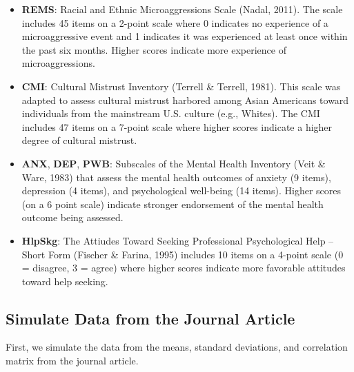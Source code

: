 \documentclass[
]{book}
\providecommand{\tightlist}{%
  \setlength{\itemsep}{0pt}\setlength{\parskip}{0pt}}
\begin{document}
\begin{itemize}
\tightlist
\item
  \textbf{REMS}: Racial and Ethnic Microaggressions Scale (Nadal, 2011). The scale includes 45 items on a 2-point scale where 0 indicates no experience of a microaggressive event and 1 indicates it was experienced at least once within the past six months. Higher scores indicate more experience of microaggressions.
\item
  \textbf{CMI}: Cultural Mistrust Inventory (Terrell \& Terrell, 1981). This scale was adapted to assess cultural mistrust harbored among Asian Americans toward individuals from the mainstream U.S. culture (e.g., Whites). The CMI includes 47 items on a 7-point scale where higher scores indicate a higher degree of cultural mistrust.
\item
  \textbf{ANX}, \textbf{DEP}, \textbf{PWB}: Subscales of the Mental Health Inventory (Veit \& Ware, 1983) that assess the mental health outcomes of anxiety (9 items), depression (4 items), and psychological well-being (14 items). Higher scores (on a 6 point scale) indicate stronger endorsement of the mental health outcome being assessed.
\item
  \textbf{HlpSkg}: The Attiudes Toward Seeking Professional Psychological Help -- Short Form (Fischer \& Farina, 1995) includes 10 items on a 4-point scale (0 = disagree, 3 = agree) where higher scores indicate more favorable attitudes toward help seeking.
\end{itemize}

\hypertarget{simulate-data-from-the-journal-article-1}{%
\subsection{Simulate Data from the Journal Article}\label{simulate-data-from-the-journal-article-1}}

First, we simulate the data from the means, standard deviations, and correlation matrix from the journal article.
\end{document}
